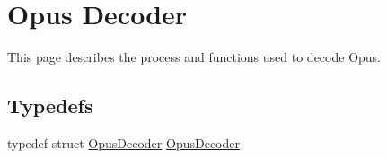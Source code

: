 \hypertarget{group__opus__decoder}{}\section{Opus Decoder}
\label{group__opus__decoder}


This page describes the process and functions used to decode Opus.  


\subsection*{Typedefs}
\begin{DoxyCompactItemize}
\item 
typedef struct \hyperlink{group__opus__decoder_ga401d8579958d36094715a6b90cd159a6}{Opus\+Decoder} \hyperlink{group__opus__decoder_ga401d8579958d36094715a6b90cd159a6}{Opus\+Decoder}
\end{DoxyCompactItemize}

